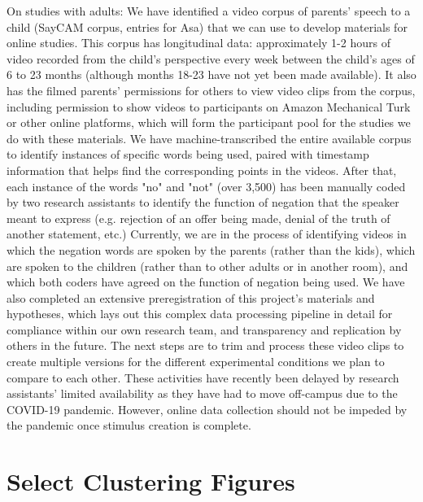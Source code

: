 \documentclass[11pt]{article}
\begin{document}
On studies with adults: We have identified a video corpus of parents' speech to a child (SayCAM corpus, entries for Asa) that we can use to develop materials for online studies. This corpus has longitudinal data: approximately 1-2 hours of video recorded from the child's perspective every week between the child's ages of 6 to 23 months (although months 18-23 have not yet been made available). It also has the filmed parents' permissions for others to view video clips from the corpus, including permission to show videos to participants on Amazon Mechanical Turk or other online platforms, which will form the participant pool for the studies we do with these materials. We have machine-transcribed the entire available corpus to identify instances of specific words being used, paired with timestamp information that helps find the corresponding points in the videos. After that, each instance of the words "no" and "not" (over 3,500) has been manually coded by two research assistants to identify the function of negation that the speaker meant to express (e.g. rejection of an offer being made, denial of the truth of another statement, etc.) Currently, we are in the process of identifying videos in which the negation words are spoken by the parents (rather than the kids), which are spoken to the children (rather than to other adults or in another room), and which both coders have agreed on the function of negation being used. We have also completed an extensive preregistration of this project's materials and hypotheses, which lays out this complex data processing pipeline in detail for compliance within our own research team, and transparency and replication by others in the future. The next steps are to trim and process these video clips to create multiple versions for the different experimental conditions we plan to compare to each other. These activities have recently been delayed by research assistants' limited availability as they have had to move off-campus due to the COVID-19 pandemic. However, online data collection should not be impeded by the pandemic once stimulus creation is complete.

\section*{Select Clustering Figures} 
\end{document}
